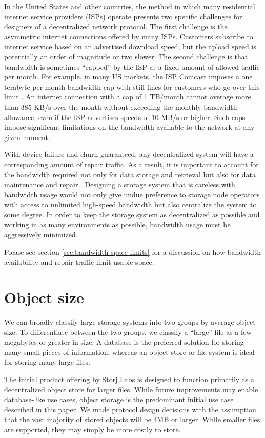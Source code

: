 \documentclass[8pt,fleqn,openany]{book}
\begin{document}
In the United States and other countries,
the method in which many residential internet service providers (ISPs)
operate presents two specific challenges for designers of a
decentralized network protocol. The first challenge is
the asymmetric internet connections offered by many ISPs.
Customers subscribe to internet service
based on an advertised download speed, but the upload speed is potentially an
order of magnitude or two slower. The second challenge is that bandwidth is
sometimes ``capped'' by the ISP at a fixed amount of allowed traffic per month.
For example, in many
US markets, the ISP Comcast imposes a one terabyte per month bandwidth cap
with stiff fines for customers who go over this limit \cite{comcast-cap}.
An internet connection with a cap of 1 TB/month cannot average more than
385 KB/s over the month without exceeding the monthly bandwidth allowance,
even if the ISP advertises speeds of 10 MB/s or higher.
Such caps impose
significant limitations on the bandwidth available to the network
at any given moment.

With device failure and churn guaranteed, any decentralized system will have a
corresponding amount of repair traffic. As a result, it is important to account
for the bandwidth required not only for data storage and retrieval but also
for data maintenance and repair \cite{pick2-churn}. Designing a
storage system that is careless with bandwidth usage would not only give undue
preference to storage node operators with access to unlimited high-speed
bandwidth but also centralize the system to some degree. In order to keep the storage
system as decentralized as possible and working in as many environments
as possible, bandwidth usage must be aggressively minimized.

Please see section \ref{sec:bandwidth-space-limits} for a discussion on how
bandwidth availability and repair traffic limit usable space.

\section{Object size}

We can broadly classify large storage systems into two groups by average
object size. To differentiate between the two groups, we classify a ``large'' file as a
few megabytes or greater in size. A database is the
preferred solution for storing many small pieces of information,
whereas an object store or file system is ideal for storing many large files.

The initial product offering by Storj Labs is designed to function primarily as
a decentralized object store for larger files.
While future improvements may enable
database-like use cases, object storage is the predominant initial use case described in
this paper. We made protocol design decisions with the assumption that the
vast majority of stored objects will be 4MB or larger. While smaller files are
supported, they may simply be more costly to store.
\end{document}
